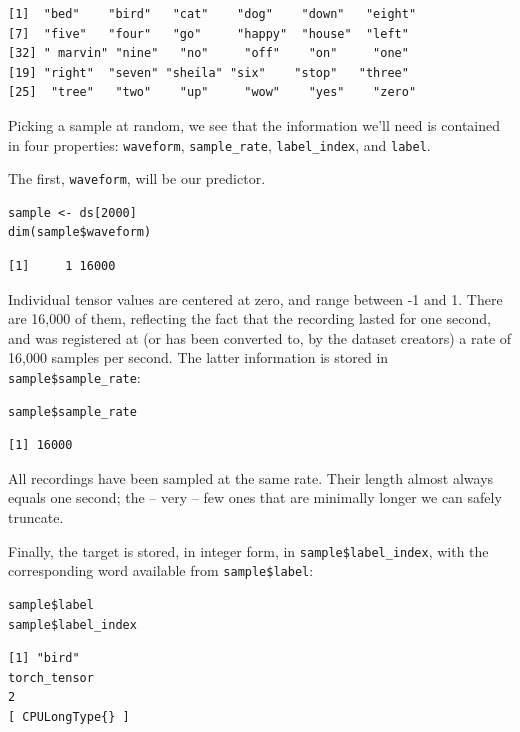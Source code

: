 \documentclass[
  letterpaper,
]{krantz}
\begin{document}
\begin{verbatim}
[1]  "bed"    "bird"   "cat"    "dog"    "down"   "eight"
[7]  "five"   "four"   "go"     "happy"  "house"  "left"
[32] " marvin" "nine"   "no"     "off"    "on"     "one"
[19] "right"  "seven" "sheila" "six"    "stop"   "three"
[25]  "tree"   "two"    "up"     "wow"    "yes"    "zero" 
\end{verbatim}

Picking a sample at random, we see that the information we'll need is
contained in four properties: \texttt{waveform}, \texttt{sample\_rate},
\texttt{label\_index}, and \texttt{label}.

The first, \texttt{waveform}, will be our predictor.

\begin{verbatim}
sample <- ds[2000]
dim(sample$waveform)
\end{verbatim}

\begin{verbatim}
[1]     1 16000
\end{verbatim}

Individual tensor values are centered at zero, and range between -1 and
1. There are 16,000 of them, reflecting the fact that the recording
lasted for one second, and was registered at (or has been converted to,
by the dataset creators) a rate of 16,000 samples per second. The latter
information is stored in \texttt{sample\$sample\_rate}:

\begin{verbatim}
sample$sample_rate
\end{verbatim}

\begin{verbatim}
[1] 16000
\end{verbatim}

All recordings have been sampled at the same rate. Their length almost
always equals one second; the -- very -- few ones that are minimally
longer we can safely truncate.

Finally, the target is stored, in integer form, in
\texttt{sample\$label\_index}, with the corresponding word available
from \texttt{sample\$label}:

\begin{verbatim}
sample$label
sample$label_index
\end{verbatim}

\begin{verbatim}
[1] "bird"
torch_tensor
2
[ CPULongType{} ]
\end{verbatim}
\end{document}
